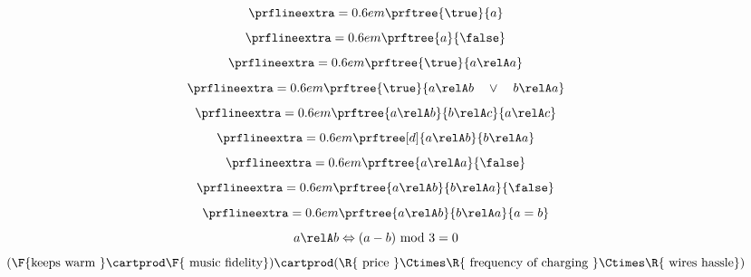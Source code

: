 {\begin{forslides}
\begin{equation}
        \end{equation}
        \begin{equation}
            \label{eq:top1}
            \prflineextra=0.6em
            \prftree{\true}{a}
        \end{equation}
        \begin{equation}
            \label{eq:bot1}
            \prflineextra=0.6em
            \prftree{a}{\false}
        \end{equation}
        \begin{equation}
            \label{eq:rel_refl}
            \prflineextra=0.6em
            \prftree{\true}{a\relA a}
        \end{equation}
        \begin{equation}
            \label{eq:rel_tot}
            \prflineextra=0.6em
            \prftree{\true}{a\relA b \quad \vee \quad b\relA a}
        \end{equation}
        \begin{equation}
            \label{eq:rel_tran}
            \prflineextra=0.6em
            \prftree{a\relA b}{b\relA c}{a\relA c}
        \end{equation}
        \begin{equation}
            \label{eq:rel_sym}
            \prflineextra=0.6em
            \prftree[d]{a \relA b}{b\relA a}
        \end{equation}
        \begin{equation}
            \label{eq:rel_irr}
            \prflineextra=0.6em
            \prftree{a \relA a}{\false}
        \end{equation}
        \begin{equation}
            \label{eq:rel_asy}
            \prflineextra=0.6em
            \prftree{a \relA b}{b\relA a}{\false}
        \end{equation}
        \begin{equation}
            \label{eq:rel_antisy}
            \prflineextra=0.6em
            \prftree{a \relA b}{b\relA a}{a=b}
        \end{equation}
        \begin{equation}
            \label{eq:ex}
            a\relA b \Leftrightarrow (a-b) \text{ mod }3=0
        \end{equation}
        \begin{equation}
            \label{eq:fun_cost}
            (\F{\text{keeps warm }}\cartprod \F{\text{ music fidelity}})\cartprod(\R{\text{ price }} \Ctimes \R{\text{ frequency of charging }}\Ctimes \R{\text{ wires hassle}})

\end{equation}
\end{forslides}}
